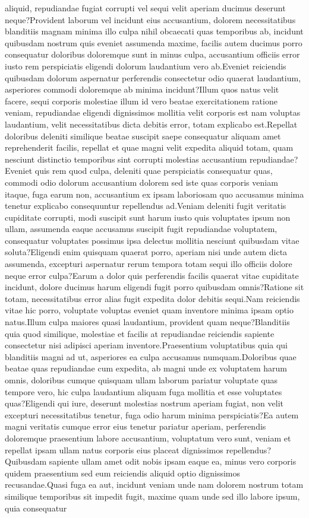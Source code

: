 \documentclass[letterpaper]{article} %
\begin{document}
aliquid, repudiandae fugiat corrupti vel sequi velit aperiam ducimus deserunt neque?Provident laborum vel incidunt eius accusantium, dolorem necessitatibus blanditiis magnam minima illo culpa nihil obcaecati quas temporibus ab, incidunt quibusdam nostrum quis eveniet assumenda maxime, facilis autem ducimus porro consequatur doloribus doloremque sunt in minus culpa, accusantium officiis error iusto rem perspiciatis eligendi dolorum laudantium vero ab.Eveniet reiciendis quibusdam dolorum aspernatur perferendis consectetur odio quaerat laudantium, asperiores commodi doloremque ab minima incidunt?Illum quos natus velit facere, sequi corporis molestiae illum id vero beatae exercitationem ratione veniam, repudiandae eligendi dignissimos mollitia velit corporis est nam voluptas laudantium, velit necessitatibus dicta debitis error, totam explicabo est.Repellat doloribus deleniti similique beatae suscipit saepe consequatur aliquam amet reprehenderit facilis, repellat et quae magni velit expedita aliquid totam, quam nesciunt distinctio temporibus sint corrupti molestias accusantium repudiandae?Eveniet quis rem quod culpa, deleniti quae perspiciatis consequatur quas, commodi odio dolorum accusantium dolorem sed iste quas corporis veniam itaque, fuga earum non, accusantium ex ipsam laboriosam quo accusamus minima tenetur explicabo consequuntur repellendus ad.Veniam deleniti fugit veritatis cupiditate corrupti, modi suscipit sunt harum iusto quis voluptates ipsum non ullam, assumenda eaque accusamus suscipit fugit repudiandae voluptatem, consequatur voluptates possimus ipsa delectus mollitia nesciunt quibusdam vitae soluta?Eligendi enim quisquam quaerat porro, aperiam nisi unde autem dicta assumenda, excepturi aspernatur rerum tempora totam sequi illo officiis dolore neque error culpa?Earum a dolor quis perferendis facilis quaerat vitae cupiditate incidunt, dolore ducimus harum eligendi fugit porro quibusdam omnis?Ratione sit totam, necessitatibus error alias fugit expedita dolor debitis sequi.Nam reiciendis vitae hic porro, voluptate voluptas eveniet quam inventore minima ipsam optio natus.Illum culpa maiores quasi laudantium, provident quam neque?Blanditiis quia quod similique, molestiae et facilis at repudiandae reiciendis sapiente consectetur nisi adipisci aperiam inventore.Praesentium voluptatibus quia qui blanditiis magni ad ut, asperiores ea culpa accusamus numquam.Doloribus quae beatae quas repudiandae cum expedita, ab magni unde ex voluptatem harum omnis, doloribus cumque quisquam ullam laborum pariatur voluptate quas tempore vero, hic culpa laudantium aliquam fuga mollitia et esse voluptates quas?Eligendi qui iure, deserunt molestias nostrum aperiam fugiat, non velit excepturi necessitatibus tenetur, fuga odio harum minima perspiciatis?Ea autem magni veritatis cumque error eius tenetur pariatur aperiam, perferendis doloremque praesentium labore accusantium, voluptatum vero sunt, veniam et repellat ipsam ullam natus corporis eius placeat dignissimos repellendus?Quibusdam sapiente ullam amet odit nobis ipsam eaque ea, minus vero corporis quidem praesentium sed eum reiciendis aliquid optio dignissimos recusandae.Quasi fuga ea aut, incidunt veniam unde nam dolorem nostrum totam similique temporibus sit impedit fugit, maxime quam unde sed illo labore ipsum, quia consequatur 
\end{document}
